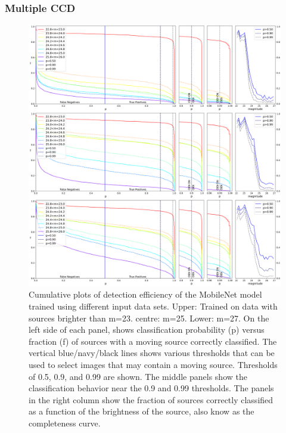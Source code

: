 \subsubsection{Multiple CCD}
\label{subsubsect:MultipleChips}

\begin{figure}[ht]
\includegraphics[width=\textwidth,keepaspectratio]{Figures/completeness_positives.png} \caption{Cumulative plots of detection efficiency of the MobileNet model trained using different input data sets.
Upper: Trained on data with sources brighter than m=23. centre: m=25. Lower: m=27.
On the left side of each panel, shows classification probability (p) versus fraction (f) of sources with a moving source correctly classified. 
The vertical blue/navy/black lines shows various thresholds that can be used to select images that may contain a moving source.
Thresholds of 0.5, 0.9, and 0.99 are shown.
The middle panels show the classification behavior near the 0.9 and 0.99 thresholds.
The panels in the right column show the fraction of sources correctly classified as a function of the brightness of the source, also know as the completeness curve. \label{fig:completeness single}} 
\end{figure}

